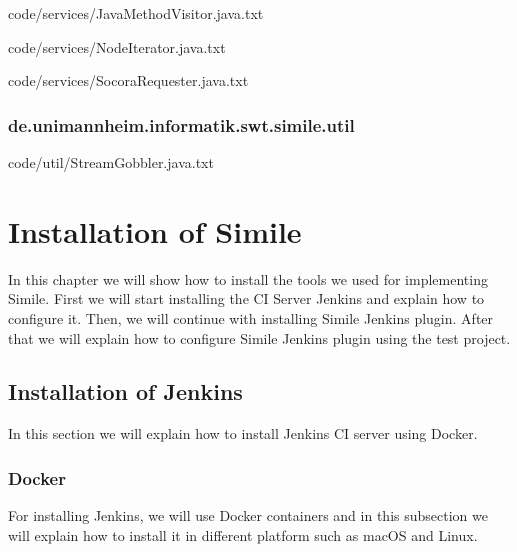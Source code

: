 
{code/services/JavaMethodVisitor.java.txt}


{code/services/NodeIterator.java.txt}


{code/services/SocoraRequester.java.txt}
\subsection{de.unimannheim.informatik.swt.simile.util}

{code/util/StreamGobbler.java.txt}

\chapter{Installation of Simile}
In this chapter we will show how to install the tools we used for implementing Simile. First we will start installing the CI Server Jenkins and explain how to configure it. Then, we will continue with installing Simile Jenkins plugin. After that we will explain how to configure Simile Jenkins plugin using the test project.

\section{Installation of Jenkins}
In this section we will explain how to install Jenkins CI server using Docker.

\subsection{Docker}
For installing Jenkins, we will use Docker containers and in this subsection we will explain how to install it in different platform such as macOS and Linux.


